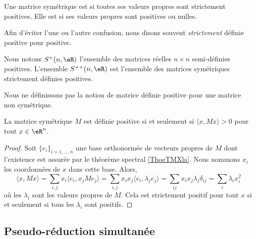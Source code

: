 \begin{definition}    \label{DefAWAooCMPuVM}
    Une matrice symétrique est  si toutes ses valeurs propres sont strictement positives. Elle est  si ses valeurs propres sont positives ou nulles.
\end{definition}
Afin d'éviter l'une ou l'autre confusion, nous disons souvent \emph{strictement} définie positive pour positive.

Nous notons \( S^+(n,\eR)\) l'ensemble des matrices réelles \( n\times n\) semi-définies positives. L'ensemble \( S^{++}(n,\eR)\) est l'ensemble des matrices symétriques strictement définies positives.

\begin{remark}
    Nous ne définissons pas la notion de matrice définie positive pour une matrice non symétrique.
\end{remark}

\begin{lemma}   \label{LemWZFSooYvksjw}
    La matrice symétrique \( M\) est définie positive si et seulement si \( \langle x, Mx\rangle >0\) pour tout \( x\in \eR^n\). 
\end{lemma}

\begin{proof}
    Soit \( \{ e_i \}_{i=1,\ldots, n}\) une base orthonormée de vecteurs propres de \( M\) dont l'existence est assurée par le théorème spectral \ref{ThoeTMXla}. Nous nommons \( x_i\) les coordonnées de \( x\) dans cette base. Alors,
    \begin{equation}
        \langle x,Mx \rangle =\sum_{i,j}x_i\langle e_i, x_jMe_j\rangle =\sum_{i,j}x_ix_j\langle e_i, \lambda_je_j\rangle =\sum_{ij}x_ix_j\lambda_j\delta_{ij}=\sum_i\lambda_ix_i^2
    \end{equation}
    où les \( \lambda_i\) sont les valeurs propres de \( M\). Cela est strictement positif pour tout \( x\) si et seulement si tous les \( \lambda_i\) sont positifs.
\end{proof}

\subsection{Pseudo-réduction simultanée}

